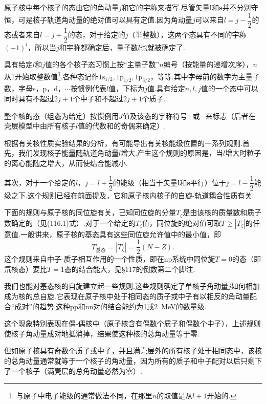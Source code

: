 原子核中每个核子的态由它的角动量$j$和它的宇称来描写.尽管矢量$\boldsymbol{l}$和$\boldsymbol{s}$并不分别守恒，可是核子轨道角动量的绝对值可以具有定值.因为角动量$j$可以来自$l=j-\dfrac{1}{2}$的态或者来自$l=j+\dfrac{1}{2}$的态，对于给定的$j$（半整数），这两个态具有不同的宇称$(-1)^l$，所以当$j$和宇称都确定后，量子数$l$也就被确定了.

具有给定$l$和$j$值的各个核子态习惯上按“主量子数”$n$编号（按能量的递增次序），$n$从1开始取整数值\footnote{与原子中电子能级的通常做法不同，在那里$n$的取值是从$l+1$开始的.}.各种态记作$1\mathrm{s}_{1/2},1\mathrm{p}_{1/2},1\mathrm{p}_{3/2}$，等等.其中字母前的数字为主量子数，字母s，p，d，$\cdots$按惯例代表$l$值，下标为$j$值.具有给定$n,l,j$值的一个态中可以同时具有不超过$2j+1$个中子和不超过$2j+1$个质子.

整个核的态（组态为给定）按惯例用$J$值及该态的宇称符号$+$或$-$来标志（后者在壳层模型中由所有核子$l$值的代数和的奇偶来确定）.

根据有关核性质实验结果的分析，有可能导出有关核能级位置的一系列规则.首先，我们发现核子能量随轨道角动量$l$增大.产生这个规则的原因是，当$l$增大时粒子的离心能随之增大，从而使结合能减小.

其次，对于一个给定的$l$，$j=l+\dfrac{1}{2}$的能级（相当于矢量$\boldsymbol{l}$和$\boldsymbol{s}$平行）位于$j=l-\dfrac{1}{2}$能级之下.这个规则已经在前面提及，它和原子核内核子的自旋-轨道耦合性质有关.

下面的规则与原子核的同位旋有关，已知同位旋的分量$T_\zeta$是由该核的质量数和质子数确定的（见(116.1)式）.对于一个给定的$T_\zeta$值，同位旋的绝对值可取$T\geqslant|T_\zeta|$的任意值.一般讲来，原子核的基态具有这些同位旋允许值中的最小值，即
\begin{equation}
  T_{\text{基态}}=|T_\zeta|=\frac{1}{2}(N-Z).
\end{equation}
这个规则来自中子-质子相互作用的一个性质，即在np系统中同位旋$T=0$的态（即氘核态）要比$T=1$态的结合能大，见§117的倒数第二个脚注.

我们也能对基态核的自旋建立起一些规则.这些规则确定了单核子角动量$j$如何相加成为核的总自旋.它表现在原子核中处于相同态的质子或中子有以相反的角动量配合“成对”的趋势.这种pp和nn对的结合能约为1或2~MeV的数量级.

这个现象特别表现在偶-偶核中（原子核含有偶数个质子和偶数个中子），上述规则使核子角动量成对地抵消掉，结果使这种核的总角动量等于零.

但如原子核具有奇数个质子或中子，并且满壳层外的所有核子处于相同态中，该核的总角动量通常就等于一个核子的角动量，因为所有的质子和中子配对以后只剩下了一个核子（满壳层的总角动量必然为零）.

